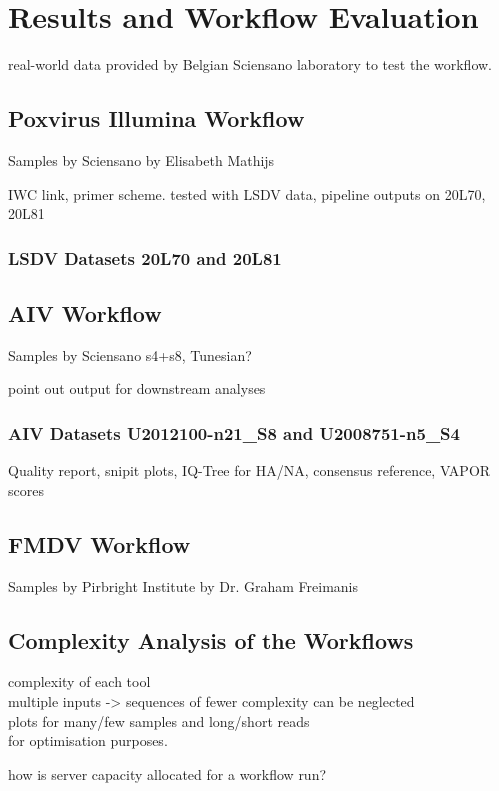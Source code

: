 \chapter{Results and Workflow Evaluation}\label{chap:results}

real-world data provided by Belgian Sciensano laboratory to test the workflow.

\section{Poxvirus Illumina Workflow}
Samples by Sciensano by Elisabeth Mathijs

\acs{IWC} link, primer scheme.
tested with \ac{LSDV} data,
pipeline outputs on 20L70, 20L81

\subsection{LSDV Datasets 20L70 and 20L81}

\section{AIV Workflow}\label{sec:4-aiv} 
Samples by Sciensano s4+s8, Tunesian?

point out output for downstream analyses

\subsection{AIV Datasets U2012100-n21\_S8 and U2008751-n5\_S4}
Quality report, snipit plots, IQ-Tree for \ac{HA}/\ac{NA}, consensus reference, VAPOR scores

\section{FMDV Workflow}
Samples by Pirbright Institute by Dr. Graham Freimanis

\section{Complexity Analysis of the Workflows}
complexity of each tool \\
multiple inputs -> sequences of fewer complexity can be neglected \\
plots for many/few samples and long/short reads \\

for optimisation purposes.

how is server capacity allocated for a workflow run?
